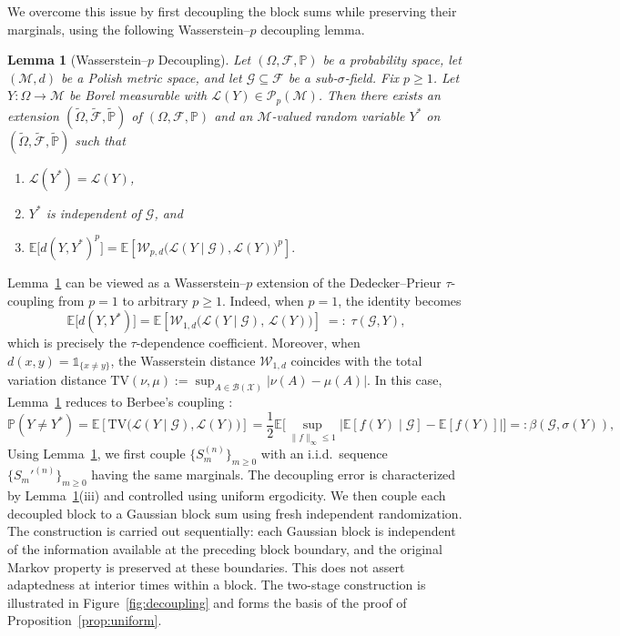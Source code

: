 \documentclass[11pt,letterpaper]{article}
\theoremstyle{plain}
\newtheorem{lemma}{Lemma}
\theoremstyle{definition}
\theoremstyle{remark}
\newcommand{\W}{\mathcal{W}}
\begin{document}
We overcome this issue by first decoupling the block sums while preserving
their marginals, using the following Wasserstein--\(p\) decoupling lemma.
\begin{lemma}[Wasserstein--$p$ Decoupling]\label{lem:wp-decoupling}
Let $(\Omega,\mathcal F,\mathbb P)$ be a probability space, let $(\mathcal M,d)$ be a
Polish metric space, and let $\mathcal G\subseteq\mathcal F$ be a sub-$\sigma$-field. Fix $p\ge 1$.
Let $Y:\Omega\to\mathcal M$ be Borel measurable with
$\mathcal L(Y)\in\mathcal P_p(\mathcal M)$.  Then there exists an extension $(\widetilde\Omega,\widetilde{\mathcal F},
\widetilde{\mathbb P})$ of $(\Omega,\mathcal F,\mathbb P)$ and an $\mathcal M$-valued
random variable $Y^*$ on $(\widetilde\Omega,\widetilde{\mathcal F},\widetilde{\mathbb P})$
such that
\begin{enumerate}
\item $\mathcal L(Y^*)=\mathcal L(Y)$,
\item $Y^*$ is independent of $\mathcal G$, and
\item $\mathbb E\big[d(Y,Y^*)^p\big]
=
\mathbb E\left[\W_{p,d}\big(\mathcal L(Y\mid\mathcal G),\mathcal L(Y)\big)^p\right].$
\end{enumerate}
\end{lemma}
Lemma~\ref{lem:wp-decoupling} can be viewed as a Wasserstein--\(p\)
extension of the Dedecker--Prieur \(\tau\)-coupling
\cite{dedecker2004coupling} from \(p=1\) to arbitrary \(p\geq1\).
Indeed, when \(p=1\), the identity becomes
\[
\mathbb E\big[d(Y,Y^*)\big]
=
\mathbb E \left[ \mathcal W_{1,d} \big(\mathcal L(Y\mid\mathcal G),\,\mathcal L(Y)\big)\right]
\;=:\;
\tau(\mathcal G,Y),
\]
which is precisely the \(\tau\)-dependence coefficient.
 Moreover,  when  $d(x,y)=\mathds 1_{\{x\neq y\}}$, the Wasserstein distance \(\W_{1,d}\) coincides with the total variation
distance $\mathrm{TV}(\nu,\mu):=\sup_{A\in\mathcal B(\mathcal X)}|\nu(A)-\mu(A)|$. In this case, Lemma~\ref{lem:wp-decoupling} reduces to Berbee's coupling
\cite{doukhan1995invariance}:
\[
\mathbb P(Y\neq Y^*)
=
\mathbb E\left[\mathrm{TV}\big(\mathcal L(Y\mid\mathcal G),\mathcal L(Y)\big)\right] = \frac{1}{2} \mathbb{E}\Big[\sup _{\|f\|_{\infty} \leq 1}|\mathbb{E}[f(Y) \mid \mathcal{G}]-\mathbb{E}[f(Y)]|\Big]
=:
\beta(\mathcal G,\sigma(Y)),
\]
Using Lemma~\ref{lem:wp-decoupling}, we first couple
\(\{S_m^{(n)}\}_{m\geq0}\) with an i.i.d.\ sequence
\(\{S_m'^{(n)}\}_{m\geq0}\) having the same marginals. The decoupling error is
characterized by Lemma~\ref{lem:wp-decoupling}(iii) and controlled using
uniform ergodicity. We then couple each decoupled block to a Gaussian
block sum using fresh independent randomization. The construction is carried
out sequentially: each Gaussian block is independent of the information
available at the preceding block boundary, and the original Markov property
is preserved at these boundaries. This does not assert adaptedness at
interior times within a block. The two-stage construction is illustrated in
Figure~\ref{fig:decoupling} and forms the basis of the proof of
Proposition~\ref{prop:uniform}.
\end{document}
